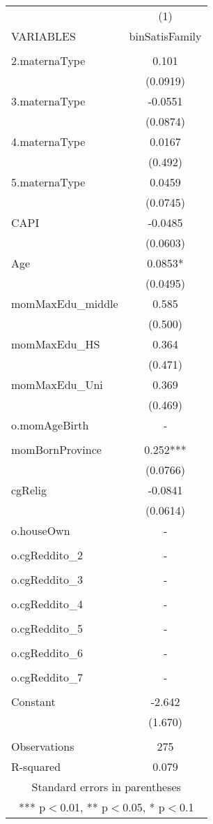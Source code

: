 \begin{tabular}{lc} \hline
 & (1) \\
VARIABLES & binSatisFamily \\ \hline
 &  \\
2.maternaType & 0.101 \\
 & (0.0919) \\
3.maternaType & -0.0551 \\
 & (0.0874) \\
4.maternaType & 0.0167 \\
 & (0.492) \\
5.maternaType & 0.0459 \\
 & (0.0745) \\
CAPI & -0.0485 \\
 & (0.0603) \\
Age & 0.0853* \\
 & (0.0495) \\
momMaxEdu\_middle & 0.585 \\
 & (0.500) \\
momMaxEdu\_HS & 0.364 \\
 & (0.471) \\
momMaxEdu\_Uni & 0.369 \\
 & (0.469) \\
o.momAgeBirth & - \\
 &  \\
momBornProvince & 0.252*** \\
 & (0.0766) \\
cgRelig & -0.0841 \\
 & (0.0614) \\
o.houseOwn & - \\
 &  \\
o.cgReddito\_2 & - \\
 &  \\
o.cgReddito\_3 & - \\
 &  \\
o.cgReddito\_4 & - \\
 &  \\
o.cgReddito\_5 & - \\
 &  \\
o.cgReddito\_6 & - \\
 &  \\
o.cgReddito\_7 & - \\
 &  \\
Constant & -2.642 \\
 & (1.670) \\
 &  \\
Observations & 275 \\
 R-squared & 0.079 \\ \hline
\multicolumn{2}{c}{ Standard errors in parentheses} \\
\multicolumn{2}{c}{ *** p$<$0.01, ** p$<$0.05, * p$<$0.1} \\
\end{tabular}
